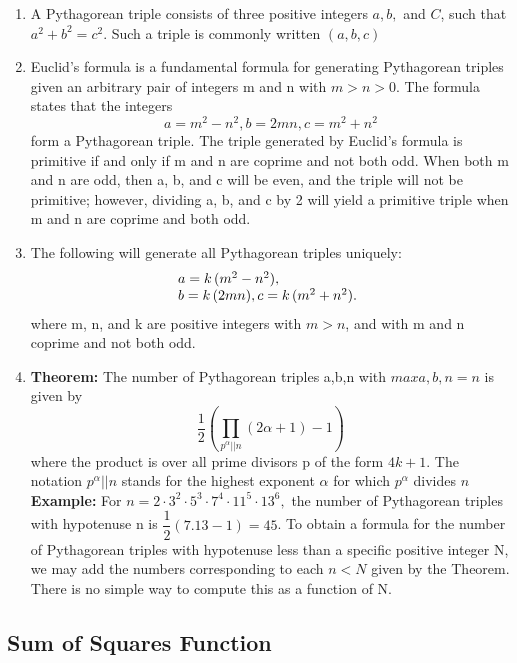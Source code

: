 \begin{enumerate}[resume]
    \item A Pythagorean triple consists of three positive integers $\displaystyle a, b,$ and $\displaystyle C$, such that $\displaystyle a^{2}+b^{2}=c^{2}$. Such a triple is commonly written $\displaystyle (a, b, c)$
    \item Euclid’s formula is a fundamental formula for generating Pythagorean triples given an arbitrary pair of integers m and n with $m >n >0$. The formula states that the integers
          \[\displaystyle a = m^{2}-n^{2}, b = 2mn,  c = m^{2}+n^{2}\]
          form a Pythagorean triple. The triple generated by Euclid’s formula is primitive if and only if m and n are coprime and not both odd. When both m and n are odd, then a, b, and c will be even, and the triple will not be primitive; however, dividing a, b, and c by 2 will yield a primitive triple when m and n are coprime and both odd.
    \item The following will generate all Pythagorean triples uniquely:
          \[
              \begin{array}{@{}l}
                  a = k\,(m^{2} - n^{2}), \\
                  b = k\,(2mn),
                  c = k\,(m^{2} + n^{2}).
              \end{array}
          \]
          where m, n, and k are positive integers with $m > n$, and with m and n coprime and not both odd.
    \item \textbf{Theorem:}
          The number of Pythagorean triples
              {a,b,n} with $max{a,b,n} = n$ is given by
          \[\displaystyle \dfrac{1}{2}\left( \displaystyle\prod _{ p^{\alpha} || n}\left( 2\alpha +1\right) -1\right)\]
          where the product is over all prime divisors p of the form $4k+1$.
          The notation $\displaystyle p^{\alpha} || n$ stands for the highest exponent $\displaystyle \alpha$ for which $\displaystyle p^{\alpha}$ divides $n$
          \textbf{Example:}
          For $n = 2\cdot3^{2}\cdot5^{3}\cdot7^{4}\cdot11^{5}\cdot13^{6},$ the number of Pythagorean triples with hypotenuse n is $\displaystyle \dfrac{1}{2}\left( 7.13-1\right) =45$.
          To obtain a formula for the number of Pythagorean triples with hypotenuse less than a specific positive integer N, we may add the numbers corresponding to each $n < N$ given by the Theorem. There is no simple way to compute this as a function of N.
\end{enumerate}

\subsection{Sum of Squares Function}

